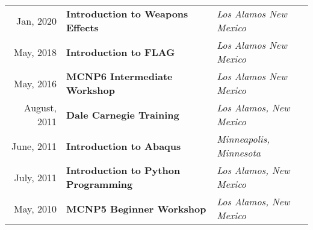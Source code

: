 
\begin{minipage}{\textwidth}
	\begin{tabular}{r|ll}
 		Jan, 2020 & \textbf{Introduction to Weapons Effects} &  \textit{Los Alamos New Mexico}  \\
 		May, 2018 & \textbf{Introduction to FLAG} &  \textit{Los Alamos New Mexico}  \\
 		May, 2016 & \textbf{MCNP6 Intermediate Workshop} &  \textit{Los Alamos New Mexico}  \\
 		August, 2011 & \textbf{Dale Carnegie Training} & \textit{Los Alamos, New Mexico}  \\
 		June, 2011 & \textbf{Introduction to Abaqus} & \textit{Minneapolis, Minnesota} \\
 		July, 2011 & \textbf{Introduction to Python Programming} & \textit{Los Alamos, New Mexico} \\
 		May, 2010 & \textbf{MCNP5 Beginner Workshop} & \textit{Los Alamos, New Mexico} \\
 	\end{tabular}
\end{minipage}

